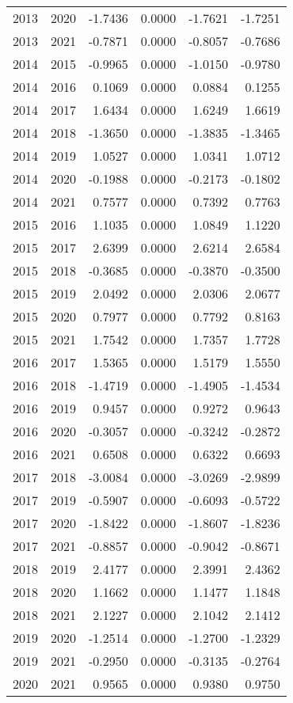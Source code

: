 \begin{tabular}{llrrrr}
2013 & 2020 & -1.7436 & 0.0000 & -1.7621 & -1.7251 \\
2013 & 2021 & -0.7871 & 0.0000 & -0.8057 & -0.7686 \\
2014 & 2015 & -0.9965 & 0.0000 & -1.0150 & -0.9780 \\
2014 & 2016 & 0.1069 & 0.0000 & 0.0884 & 0.1255 \\
2014 & 2017 & 1.6434 & 0.0000 & 1.6249 & 1.6619 \\
2014 & 2018 & -1.3650 & 0.0000 & -1.3835 & -1.3465 \\
2014 & 2019 & 1.0527 & 0.0000 & 1.0341 & 1.0712 \\
2014 & 2020 & -0.1988 & 0.0000 & -0.2173 & -0.1802 \\
2014 & 2021 & 0.7577 & 0.0000 & 0.7392 & 0.7763 \\
2015 & 2016 & 1.1035 & 0.0000 & 1.0849 & 1.1220 \\
2015 & 2017 & 2.6399 & 0.0000 & 2.6214 & 2.6584 \\
2015 & 2018 & -0.3685 & 0.0000 & -0.3870 & -0.3500 \\
2015 & 2019 & 2.0492 & 0.0000 & 2.0306 & 2.0677 \\
2015 & 2020 & 0.7977 & 0.0000 & 0.7792 & 0.8163 \\
2015 & 2021 & 1.7542 & 0.0000 & 1.7357 & 1.7728 \\
2016 & 2017 & 1.5365 & 0.0000 & 1.5179 & 1.5550 \\
2016 & 2018 & -1.4719 & 0.0000 & -1.4905 & -1.4534 \\
2016 & 2019 & 0.9457 & 0.0000 & 0.9272 & 0.9643 \\
2016 & 2020 & -0.3057 & 0.0000 & -0.3242 & -0.2872 \\
2016 & 2021 & 0.6508 & 0.0000 & 0.6322 & 0.6693 \\
2017 & 2018 & -3.0084 & 0.0000 & -3.0269 & -2.9899 \\
2017 & 2019 & -0.5907 & 0.0000 & -0.6093 & -0.5722 \\
2017 & 2020 & -1.8422 & 0.0000 & -1.8607 & -1.8236 \\
2017 & 2021 & -0.8857 & 0.0000 & -0.9042 & -0.8671 \\
2018 & 2019 & 2.4177 & 0.0000 & 2.3991 & 2.4362 \\
2018 & 2020 & 1.1662 & 0.0000 & 1.1477 & 1.1848 \\
2018 & 2021 & 2.1227 & 0.0000 & 2.1042 & 2.1412 \\
2019 & 2020 & -1.2514 & 0.0000 & -1.2700 & -1.2329 \\
2019 & 2021 & -0.2950 & 0.0000 & -0.3135 & -0.2764 \\
2020 & 2021 & 0.9565 & 0.0000 & 0.9380 & 0.9750 \\
\bottomrule
\end{tabular}
